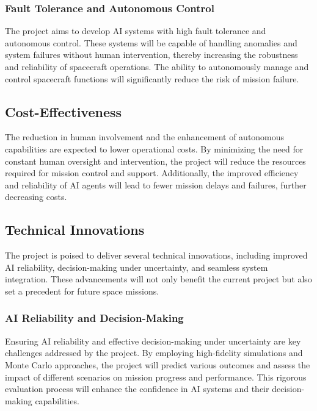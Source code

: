 \documentclass[a4paper, 11pt]{article}
\begin{document}
\subsubsection{Fault Tolerance and Autonomous Control}

The project aims to develop AI systems with high fault tolerance and autonomous control. These systems will be capable of handling anomalies and system failures without human intervention, thereby increasing the robustness and reliability of spacecraft operations. The ability to autonomously manage and control spacecraft functions will significantly reduce the risk of mission failure.

\subsection{Cost-Effectiveness}

The reduction in human involvement and the enhancement of autonomous capabilities are expected to lower operational costs. By minimizing the need for constant human oversight and intervention, the project will reduce the resources required for mission control and support. Additionally, the improved efficiency and reliability of AI agents will lead to fewer mission delays and failures, further decreasing costs.

\subsection{Technical Innovations}

The project is poised to deliver several technical innovations, including improved AI reliability, decision-making under uncertainty, and seamless system integration. These advancements will not only benefit the current project but also set a precedent for future space missions.

\subsubsection{AI Reliability and Decision-Making}

Ensuring AI reliability and effective decision-making under uncertainty are key challenges addressed by the project. By employing high-fidelity simulations and Monte Carlo approaches, the project will predict various outcomes and assess the impact of different scenarios on mission progress and performance. This rigorous evaluation process will enhance the confidence in AI systems and their decision-making capabilities.
\end{document}
